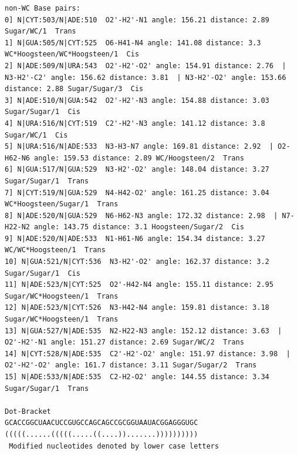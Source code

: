 \documentclass[12pt]{article}
\begin{document}
\begin{appendices}
\begin{scriptsize}
\begin{lstlisting}
non-WC Base pairs: 
0] N|CYT:503/N|ADE:510  O2'-H2'-N1 angle: 156.21 distance: 2.89 Sugar/WC/1  Trans
1] N|GUA:505/N|CYT:525  O6-H41-N4 angle: 141.08 distance: 3.3 WC*Hoogsteen/WC*Hoogsteen/1  Cis
2] N|ADE:509/N|URA:543  O2'-H2'-O2' angle: 154.91 distance: 2.76  | N3-H2'-C2' angle: 156.62 distance: 3.81  | N3-H2'-O2' angle: 153.66 distance: 2.88 Sugar/Sugar/3  Cis
3] N|ADE:510/N|GUA:542  O2'-H2'-N3 angle: 154.88 distance: 3.03 Sugar/Sugar/1  Cis
4] N|URA:516/N|CYT:519  C2'-H2'-N3 angle: 141.12 distance: 3.8 Sugar/WC/1  Cis
5] N|URA:516/N|ADE:533  N3-H3-N7 angle: 169.81 distance: 2.92  | O2-H62-N6 angle: 159.53 distance: 2.89 WC/Hoogsteen/2  Trans
6] N|GUA:517/N|GUA:529  N3-H2'-O2' angle: 148.04 distance: 3.27 Sugar/Sugar/1  Trans
7] N|CYT:519/N|GUA:529  N4-H42-O2' angle: 161.25 distance: 3.04 WC*Hoogsteen/Sugar/1  Trans
8] N|ADE:520/N|GUA:529  N6-H62-N3 angle: 172.32 distance: 2.98  | N7-H22-N2 angle: 143.75 distance: 3.1 Hoogsteen/Sugar/2  Cis
9] N|ADE:520/N|ADE:533  N1-H61-N6 angle: 154.34 distance: 3.27 WC/WC*Hoogsteen/1  Trans
10] N|GUA:521/N|CYT:536  N3-H2'-O2' angle: 162.37 distance: 3.2 Sugar/Sugar/1  Cis
11] N|ADE:523/N|CYT:525  O2'-H42-N4 angle: 155.11 distance: 2.95 Sugar/WC*Hoogsteen/1  Trans
12] N|ADE:523/N|CYT:526  N3-H42-N4 angle: 159.81 distance: 3.18 Sugar/WC*Hoogsteen/1  Trans
13] N|GUA:527/N|ADE:535  N2-H22-N3 angle: 152.12 distance: 3.63  | O2'-H2'-N1 angle: 151.27 distance: 2.69 Sugar/WC/2  Trans
14] N|CYT:528/N|ADE:535  C2'-H2'-O2' angle: 151.97 distance: 3.98  | O2'-H2'-O2' angle: 161.7 distance: 3.11 Sugar/Sugar/2  Trans
15] N|ADE:533/N|ADE:535  C2-H2-O2' angle: 144.55 distance: 3.34 Sugar/Sugar/1  Trans

Dot-Bracket
GCACCGGCUAACUCCGUGCCAGCAGCCGCGGUAAUACGGAGGGUGC
(((((......(((((.....((....)).......))))))))))
 Modified nucleotides denoted by lower case letters



\end{lstlisting}
\end{scriptsize}
\end{appendices}
\end{document}
